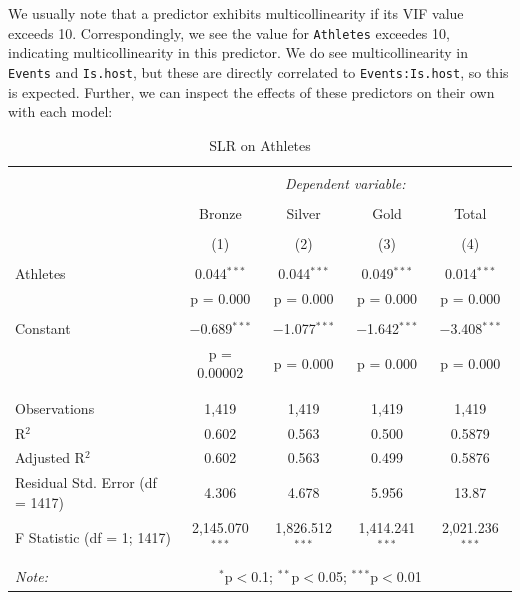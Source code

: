 \documentclass{mcmthesis}
\begin{document}
We usually note that a predictor exhibits multicollinearity if its VIF value exceeds 10. Correspondingly, we see the value for \texttt{Athletes} exceedes 10, indicating multicollinearity in this predictor. We do see multicollinearity in \texttt{Events} and \texttt{Is.host}, but these are directly correlated to \texttt{Events:Is.host}, so this is expected. Further, we can inspect the effects of these predictors on their own with each model:

\begin{longtable}{@{\extracolsep{5pt}}lcccc} 
  \caption{SLR on Athletes} 
  \label{} 
\\[-1.8ex]\hline 
\hline \\[-1.8ex] 
 & \multicolumn{4}{c}{\textit{Dependent variable:}} \\ 
\cline{2-5} 
\\[-1.8ex] & Bronze & Silver & Gold & Total \\ 
\\[-1.8ex] & (1) & (2) & (3) & (4) \\ 
\hline \\[-1.8ex] 
 Athletes & 0.044$^{***}$ & 0.044$^{***}$ & 0.049$^{***}$ & 0.014$^{***}$ \\ 
  & p = 0.000 & p = 0.000 & p = 0.000 & p = 0.000 \\ 
  & & & & \\ 
 Constant & $-$0.689$^{***}$ & $-$1.077$^{***}$ & $-$1.642$^{***}$ & $-$3.408$^{***}$\\ 
  & p = 0.00002 & p = 0.000 & p = 0.000 & p = 0.000 \\ 
  & & & & \\ 
\hline \\[-1.8ex] 
Observations & 1,419 & 1,419 & 1,419 & 1,419 \\ 
R$^{2}$ & 0.602 & 0.563 & 0.500 & 0.5879 \\ 
Adjusted R$^{2}$ & 0.602 & 0.563 & 0.499 & 0.5876 \\ 
Residual Std. Error (df = 1417) & 4.306 & 4.678 & 5.956 & 13.87 \\ 
F Statistic (df = 1; 1417) & 2,145.070$^{***}$ & 1,826.512$^{***}$ & 1,414.241$^{***}$ & 2,021.236$^{***}$ \\ 
\hline 
\hline \\[-1.8ex] 
\textit{Note:}  & \multicolumn{3}{r}{$^{*}$p$<$0.1; $^{**}$p$<$0.05; $^{***}$p$<$0.01} \\ 
\end{longtable} 
\end{document}
